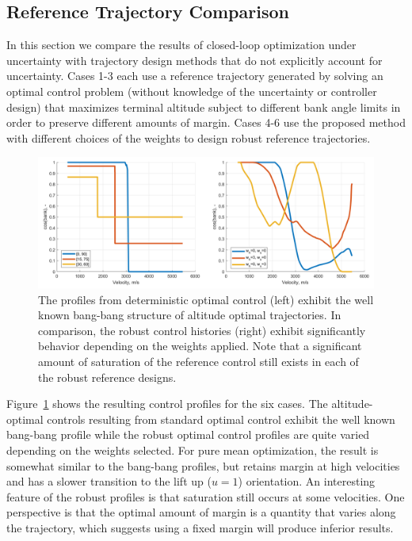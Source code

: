 \documentclass[journal ]{new-aiaa}
\begin{document}
\subsection*{Reference Trajectory Comparison}
In this section we compare the results of closed-loop optimization under uncertainty with trajectory design methods that do not explicitly account for uncertainty. Cases 1-3 each use a reference trajectory generated by solving an optimal control problem (without knowledge of the uncertainty or controller design) that maximizes terminal altitude subject to different bank angle limits in order to preserve different amounts of margin. Cases 4-6 use the proposed method with different choices of the weights to design robust reference trajectories.
\begin{figure}[h!]
	\centering
	\includegraphics[width=1\textwidth]{ddp/comparison_controls}
	\caption{The profiles from deterministic optimal control (left) exhibit the well known bang-bang structure of altitude optimal trajectories. In comparison, the robust control histories (right) exhibit significantly behavior depending on the weights applied. Note that a significant amount of saturation of the reference control still exists in each of the robust reference designs.}
	\label{fig_control_comparison}
\end{figure}
Figure~\ref{fig_control_comparison} shows the resulting control profiles for the six cases. The altitude-optimal controls resulting from standard optimal control exhibit the well known bang-bang profile while the robust optimal control profiles are quite varied depending on the weights selected. For pure mean optimization, the result is somewhat similar to the bang-bang profiles, but retains margin at high velocities and has a slower transition to the lift up ($u=1$) orientation. An interesting feature of the robust profiles is that saturation still occurs at some velocities. One perspective is that the optimal amount of margin is a quantity that varies along the trajectory, which suggests using a fixed margin will produce inferior results.
\end{document}
